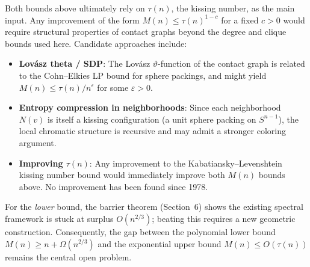 \begin{remark}
Both bounds above ultimately rely on $\tau(n)$, the kissing number, as the main input.  Any improvement of the form $M(n)\le\tau(n)^{1-c}$ for a fixed $c>0$ would require structural properties of contact graphs beyond the degree and clique bounds used here.  Candidate approaches include:
\begin{itemize}
  \item \textbf{Lovász theta / SDP}: The Lov\'asz $\vartheta$-function of the contact graph is related to the Cohn--Elkies LP bound for sphere packings, and might yield $M(n)\le\tau(n)/n^{\varepsilon}$ for some $\varepsilon>0$.
  \item \textbf{Entropy compression in neighborhoods}: Since each neighborhood $N(v)$ is itself a kissing configuration (a unit sphere packing on $S^{n-1}$), the local chromatic structure is recursive and may admit a stronger coloring argument.
  \item \textbf{Improving $\tau(n)$}: Any improvement to the Kabatiansky--Levenshtein kissing number bound would immediately improve both $M(n)$ bounds above.  No improvement has been found since 1978.
\end{itemize}
For the \emph{lower} bound, the barrier theorem (Section~6) shows the existing spectral framework is stuck at surplus $O(n^{2/3})$; beating this requires a new geometric construction.  Consequently, the gap between the polynomial lower bound $M(n)\ge n+\Omega(n^{2/3})$ and the exponential upper bound $M(n)\le O(\tau(n))$ remains the central open problem.
\end{remark}
